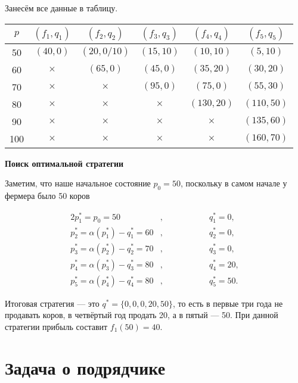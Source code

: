 \begin{enumerate}
	Занесём все данные в таблицу.
	
	\begin{table}[H]
		\centering
		\begin{tabular}{ | c | c | c | c | c | c | } 
			\hline
			$p$ & $(f_1, q_1)$ & $(f_2, q_2)$ & $(f_3, q_3)$ & $(f_4, q_4)$ & $(f_5, q_5)$ \\ 
			\hline
			50 & $(40, 0)$ & $(20, 0/10)$ & $(15, 10)$ & $(10, 10)$ & $(5, 10)$ \\\hline
			60 & $\times$ & $(65, 0)$ & $(45, 0)$ & $(35, 20)$ & $(30, 20)$ \\\hline
			70 & $\times$ & $\times$ & $(95, 0)$ & $(75, 0)$ & $(55, 30)$ \\\hline
			80 & $\times$ & $\times$ & $\times$ & $(130, 20)$ & $(110, 50)$ \\\hline
			90 & $\times$ & $\times$ & $\times$ & $\times$ & $(135, 60)$ \\\hline
			100 & $\times$ & $\times$ & $\times$ & $\times$ & $(160, 70)$ \\\hline
		\end{tabular}
	\end{table}
	
	\bigskip
	
	\textbf{Поиск оптимальной стратегии}
	
	Заметим, что наше начальное состояние $p_0 = 50$, поскольку в самом начале у фермера было 50 коров
	
	\begin{alignat*}{2}
		p_1^* = p_0 = 50&, \qquad\qquad &&q_1^* = 0, \\
		p_2^* = \alpha(p_1^*) - q^*_1 = 60 &, &&q_2^* = 0, \\
		p_3^* = \alpha(p_2^*) - q^*_2 = 70 &, &&q_3^* = 0, \\
		p_4^* = \alpha(p_3^*) - q^*_3 = 80 &, &&q_4^* = 20, \\
		p_5^* = \alpha(p_4^*) - q^*_4 = 80 &, &&q_5^* = 50.
	\end{alignat*}
	
	Итоговая стратегия --- это $q^* = \{0, 0, 0, 20, 50\}$, то есть в первые три года не продавать коров, в четвёртый год продать 20, а в пятый --- 50. При данной стратегии прибыль составит $f_1(50) = 40$.
\end{enumerate}

\section{Задача о подрядчике}

